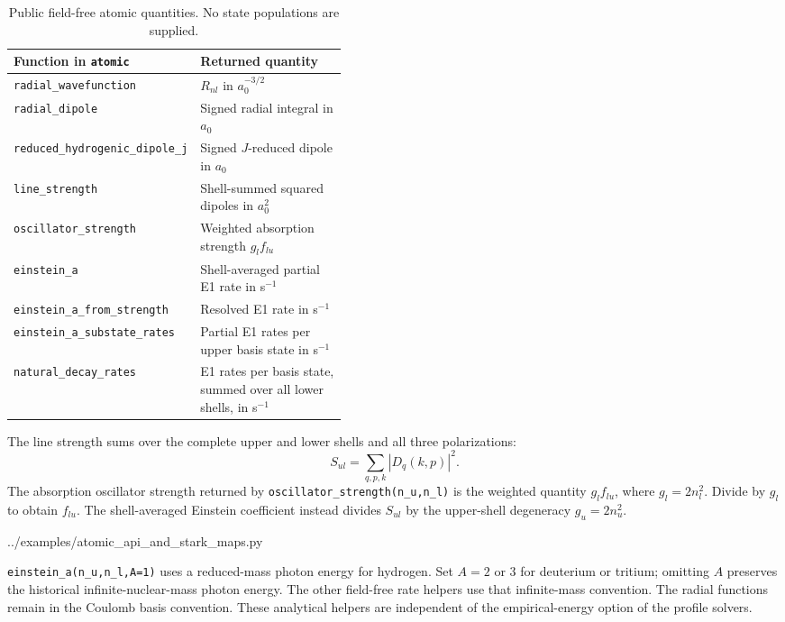 \begin{table}[htbp]
\centering\small
\begin{tabularx}{\linewidth}{@{}p{0.43\linewidth}X@{}}
\toprule
Function in \texttt{atomic} & Returned quantity \\
\midrule
\texttt{radial\_wavefunction} & $R_{nl}$ in $a_0^{-3/2}$ \\
\texttt{radial\_dipole} & Signed radial integral in $a_0$ \\
\texttt{reduced\_hydrogenic\_dipole\_j} & Signed $J$-reduced dipole in $a_0$ \\
\texttt{line\_strength} & Shell-summed squared dipoles in $a_0^2$ \\
\texttt{oscillator\_strength} & Weighted absorption strength $g_l f_{lu}$ \\
\texttt{einstein\_a} & Shell-averaged partial E1 rate in s$^{-1}$ \\
\texttt{einstein\_a\_from\_strength} & Resolved E1 rate in s$^{-1}$ \\
\texttt{einstein\_a\_substate\_rates} & Partial E1 rates per upper basis state in s$^{-1}$ \\
\texttt{natural\_decay\_rates} & E1 rates per basis state, summed over all lower shells, in s$^{-1}$ \\
\bottomrule
\end{tabularx}
\caption{Public field-free atomic quantities. No state populations are supplied.}
\label{tab:atomic_api_quantities}
\end{table}

The line strength sums over the complete upper and lower shells and all
three polarizations:
\begin{equation}
 S_{ul}=\sum_{q,p,k}|D_q(k,p)|^2.
\end{equation}
The absorption oscillator strength returned by
\texttt{oscillator\_strength(n\_u,n\_l)} is the weighted quantity $g_l f_{lu}$,
where $g_l=2n_l^2$. Divide by $g_l$ to obtain $f_{lu}$. The shell-averaged
Einstein coefficient instead divides $S_{ul}$ by the upper-shell
degeneracy $g_u=2n_u^2$.

\begin{minipage}{\linewidth}

  {../examples/atomic_api_and_stark_maps.py}
\end{minipage}

\texttt{einstein\_a(n\_u,n\_l,A=1)} uses a reduced-mass photon energy for
hydrogen. Set $A=2$ or $3$ for deuterium or tritium; omitting $A$ preserves
the historical infinite-nuclear-mass photon energy. The other field-free
rate helpers use that infinite-mass convention. The radial functions remain
in the Coulomb basis convention. These analytical helpers are independent
of the empirical-energy option of the profile solvers.

